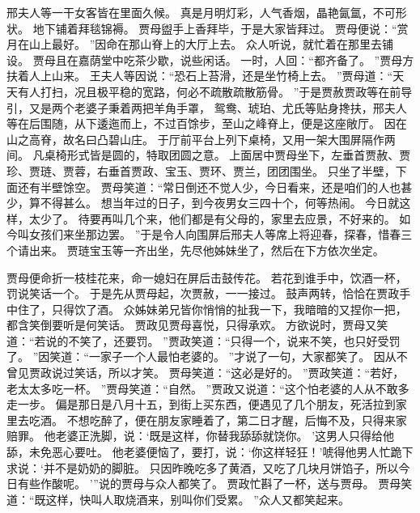 邢夫人等一干女客皆在里面久候。
真是月明灯彩，人气香烟，晶艳氤氲，不可形状。
地下铺着拜毯锦褥。
贾母盥手上香拜毕，于是大家皆拜过。
贾母便说：“赏月在山上最好。
”因命在那山脊上的大厅上去。
众人听说，就忙着在那里去铺设。
贾母且在嘉荫堂中吃茶少歇，说些闲话。
一时，人回：“都齐备了。
”贾母方扶着人上山来。
王夫人等因说：“恐石上苔滑，还是坐竹椅上去。
”贾母道：“天天有人打扫，况且极平稳的宽路，何必不疏散疏散筋骨。
”于是贾赦贾政等在前导引，又是两个老婆子秉着两把羊角手罩，
鸳鸯、琥珀、尤氏等贴身搀扶，邢夫人等在后围随，从下逶迤而上，不过百馀步，至山之峰脊上，便是这座敞厅。
因在山之高脊，故名曰凸碧山庄。
于厅前平台上列下桌椅，又用一架大围屏隔作两间。
凡桌椅形式皆是圆的，特取团圆之意。
上面居中贾母坐下，左垂首贾赦、贾珍、贾琏、贾蓉，右垂首贾政、宝玉、贾环、贾兰，团团围坐。
只坐了半壁，下面还有半壁馀空。
贾母笑道：“常日倒还不觉人少，今日看来，还是咱们的人也甚少，算不得甚么。
想当年过的日子，到今夜男女三四十个，何等热闹。
今日就这样，太少了。
待要再叫几个来，他们都是有父母的，家里去应景，不好来的。
如今叫女孩们来坐那边罢。
”于是令人向围屏后邢夫人等席上将迎春，探春，惜春三个请出来。
贾琏宝玉等一齐出坐，先尽他姊妹坐了，然后在下方依次坐定。
\par
贾母便命折一枝桂花来，命一媳妇在屏后击鼓传花。
若花到谁手中，饮酒一杯，罚说笑话一个。
于是先从贾母起，次贾赦，一一接过。
鼓声两转，恰恰在贾政手中住了，只得饮了酒。
众姊妹弟兄皆你悄悄的扯我一下，我暗暗的又捏你一把，都含笑倒要听是何笑话。
贾政见贾母喜悦，只得承欢。
方欲说时，贾母又笑道：“若说的不笑了，还要罚。
”贾政笑道：“只得一个，说来不笑，也只好受罚了。
”因笑道：“一家子一个人最怕老婆的。
”才说了一句，大家都笑了。
因从不曾见贾政说过笑话，所以才笑。
贾母笑道：“这必是好的。
”贾政笑道：“若好，老太太多吃一杯。
”贾母笑道：“自然。
”贾政又说道：“这个怕老婆的人从不敢多走一步。
偏是那日是八月十五，到街上买东西，便遇见了几个朋友，死活拉到家里去吃酒。
不想吃醉了，便在朋友家睡着了，第二日才醒，后悔不及，只得来家赔罪。
他老婆正洗脚，说：‘既是这样，你替我舔舔就饶你。
’这男人只得给他舔，未免恶心要吐。
他老婆便恼了，要打，说：‘你这样轻狂！’唬得他男人忙跪下求说：‘并不是奶奶的脚脏。
只因昨晚吃多了黄酒，又吃了几块月饼馅子，所以今日有些作酸呢。
’”说的贾母与众人都笑了。
贾政忙斟了一杯，送与贾母。
贾母笑道：“既这样，快叫人取烧酒来，别叫你们受累。
”众人又都笑起来。

